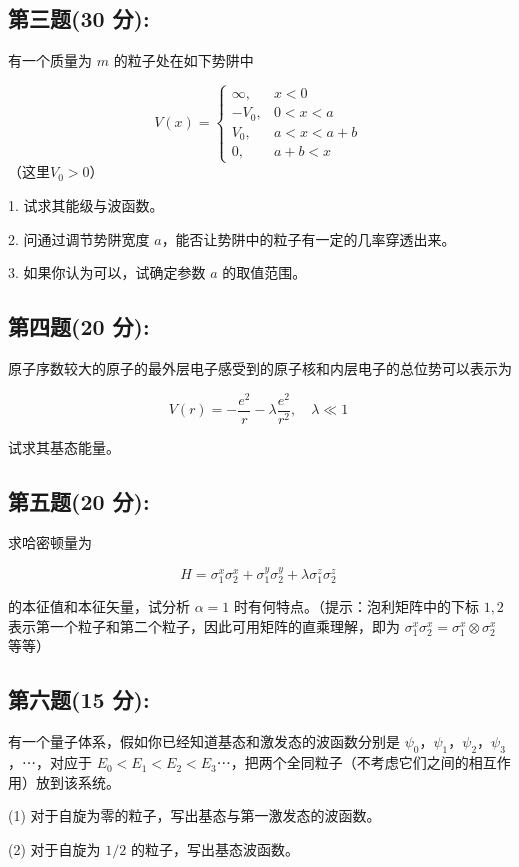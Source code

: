 \subsection{第三题(30 分):}
有一个质量为 \(m\) 的粒子处在如下势阱中

\[
V(x) = 
\begin{cases} 
\infty, & x < 0 \\
-V_0, & 0 < x < a \\
V_0, & a < x < a + b \\
0, & a + b < x
\end{cases}
~\]
（这里$V_0 > 0$）

1. 试求其能级与波函数。

2. 问通过调节势阱宽度 \(a\)，能否让势阱中的粒子有一定的几率穿透出来。

3. 如果你认为可以，试确定参数 \(a\) 的取值范围。
\subsection{第四题(20 分):}
原子序数较大的原子的最外层电子感受到的原子核和内层电子的总位势可以表示为

\[V(r) = -\frac{e^2}{r} - \lambda \frac{e^2}{r^2}, \quad \lambda \ll 1~\]

试求其基态能量。
\subsection{第五题(20 分):}
求哈密顿量为

\[H = \sigma_1^x \sigma_2^x + \sigma_1^y \sigma_2^y + \lambda \sigma_1^z \sigma_2^z~\]

的本征值和本征矢量，试分析 $\alpha = 1$ 时有何特点。（提示：泡利矩阵中的下标 $1, 2$ 表示第一个粒子和第二个粒子，因此可用矩阵的直乘理解，即为 $\sigma_1^x \sigma_2^x = \sigma_1^x \otimes \sigma_2^x$ 等等）
\subsection{第六题(15 分):}
有一个量子体系，假如你已经知道基态和激发态的波函数分别是 $\psi_0$，$\psi_1$，$\psi_2$，$\psi_3$，⋯，对应于 $E_0 < E_1 < E_2 < E_3$⋯，把两个全同粒子（不考虑它们之间的相互作用）放到该系统。

(1) 对于自旋为零的粒子，写出基态与第一激发态的波函数。

(2) 对于自旋为 $1/2$ 的粒子，写出基态波函数。